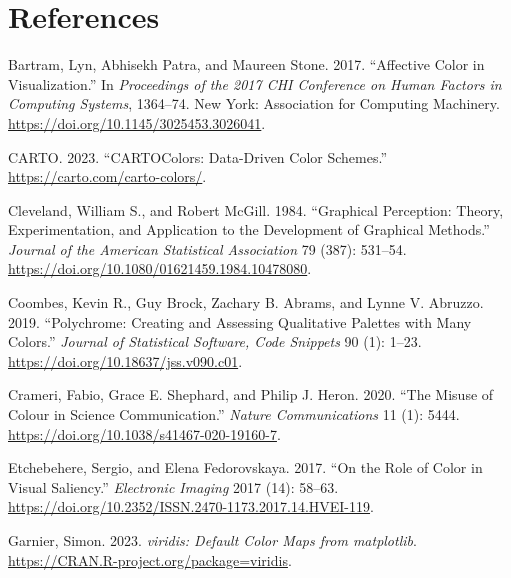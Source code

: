 \hypertarget{references}{%
\section*{References}\label{references}}

\hypertarget{refs}{}
\begin{CSLReferences}{1}{0}
\leavevmode{}%
Bartram, Lyn, Abhisekh Patra, and Maureen Stone. 2017. {``Affective Color in Visualization.''} In \emph{Proceedings of the 2017 CHI Conference on Human Factors in Computing Systems}, 1364--74. New York: Association for Computing Machinery. \url{https://doi.org/10.1145/3025453.3026041}.

\leavevmode{}%
CARTO. 2023. {``CARTOColors: Data-Driven Color Schemes.''} \url{https://carto.com/carto-colors/}.

\leavevmode{}%
Cleveland, William S., and Robert McGill. 1984. {``Graphical Perception: Theory, Experimentation, and Application to the Development of Graphical Methods.''} \emph{Journal of the American Statistical Association} 79 (387): 531--54. \url{https://doi.org/10.1080/01621459.1984.10478080}.

\leavevmode{}%
Coombes, Kevin R., Guy Brock, Zachary B. Abrams, and Lynne V. Abruzzo. 2019. {``{Polychrome}: Creating and Assessing Qualitative Palettes with Many Colors.''} \emph{Journal of Statistical Software, Code Snippets} 90 (1): 1--23. \url{https://doi.org/10.18637/jss.v090.c01}.

\leavevmode{}%
Crameri, Fabio, Grace E. Shephard, and Philip J. Heron. 2020. {``The Misuse of Colour in Science Communication.''} \emph{Nature Communications} 11 (1): 5444. \url{https://doi.org/10.1038/s41467-020-19160-7}.

\leavevmode{}%
Etchebehere, Sergio, and Elena Fedorovskaya. 2017. {``On the Role of Color in Visual Saliency.''} \emph{Electronic Imaging} 2017 (14): 58--63. \url{https://doi.org/10.2352/ISSN.2470-1173.2017.14.HVEI-119}.

\leavevmode{}%
Garnier, Simon. 2023. \emph{{viridis}: Default Color Maps from {matplotlib}}. \url{https://CRAN.R-project.org/package=viridis}.


\end{CSLReferences}
